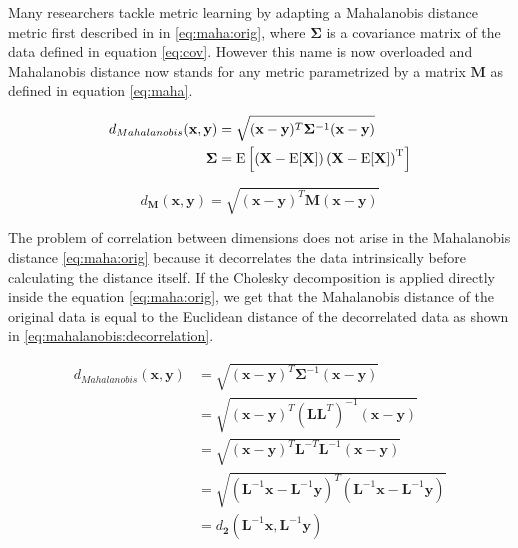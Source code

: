 \documentclass[12pt,a4paper]{report}
\begin{document}

Many researchers tackle metric learning by adapting a Mahalanobis distance metric first described in \cite{mahalanobis1936generalized} in \ref{eq:maha:orig}, where $\bm{\Sigma}$ is a covariance matrix of the data defined in equation \ref{eq:cov}. However this name is now overloaded and Mahalanobis distance now stands for any metric parametrized by a matrix $\bm{M}$ as defined in equation \ref{eq:maha}.

\begin{align} \label{eq:maha:orig}
d_{Mahalanobis}(\textbf{x},\textbf{y}) &= \sqrt{(\textbf{x}-\textbf{y})^T\bm{\Sigma}^{-1}(\textbf{x}-\textbf{y})}  \\
\bm{\Sigma} &= \mathrm {E} \left[\left(\mathbf {X} -\mathrm {E} [\mathbf {X} ]\right)\left(\mathbf {X} -\mathrm {E} [\mathbf {X} ]\right)^{\rm {T}}\right] \label{eq:cov}
\end{align}

\begin{equation} \label{eq:maha}
d_{\bm{M}}(\textbf{x},\textbf{y}) = \sqrt{(\textbf{x}-\textbf{y})^T\bm{M}(\textbf{x}-\textbf{y})} 
\end{equation}

The problem of correlation between dimensions does not arise in the Mahalanobis distance \eqref{eq:maha:orig} because it decorrelates the data intrinsically before calculating the distance itself. If the Cholesky decomposition is applied directly inside the equation \ref{eq:maha:orig}, we get that the Mahalanobis distance of the original data is equal to the Euclidean distance of the decorrelated data as shown in \ref{eq:mahalanobis:decorrelation}.

\begin{align}
  d_{Mahalanobis}(\textbf{x},\textbf{y}) &= \sqrt{(\textbf{x}-\textbf{y})^{T}\bm{\Sigma}^{-1}(\textbf{x}-\textbf{y})} \nonumber\\
         &= \sqrt{(\textbf{x}-\textbf{y})^{T}(\bm{L}\bm{L}^{T})^{-1}(\textbf{x}-\textbf{y})} \nonumber\\
         &= \sqrt{(\textbf{x}-\textbf{y})^{T}\bm{L}^{-T}\bm{L}^{-1}(\textbf{x}-\textbf{y})} \nonumber\\
         &= \sqrt{(\bm{L}^{-1}\textbf{x}-\bm{L}^{-1}\textbf{y})^{T}(\bm{L}^{-1}\textbf{x}-\bm{L}^{-1}\textbf{y})} \nonumber\\
         &= d_{\bm{2}}(\bm{L}^{-1}\textbf{x}, \bm{L}^{-1}\textbf{y}) \label{eq:mahalanobis:decorrelation}
\end{align}
\end{document}
